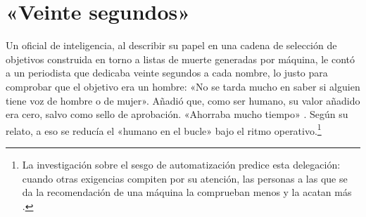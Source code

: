 \chapter{«Veinte segundos»}
\label{sec:1}
Un oficial de inteligencia, al describir su papel en una cadena de selección de objetivos construida en torno a listas de muerte generadas por máquina, le contó a un periodista que dedicaba veinte segundos a cada nombre, lo justo para comprobar que el objetivo era un hombre: «No se tarda mucho en saber si alguien tiene voz de hombre o de mujer». Añadió que, como ser humano, su valor añadido era cero, salvo como sello de aprobación. «Ahorraba mucho tiempo» \autocite{abraham2024lavender}. Según su relato, a eso se reducía el «humano en el bucle» bajo el ritmo operativo.\footnote{La investigación sobre el sesgo de automatización predice esta delegación: cuando otras exigencias compiten por su atención, las personas a las que se da la recomendación de una máquina la comprueban menos y la acatan más \autocite{parasuraman2010complacency}.}

